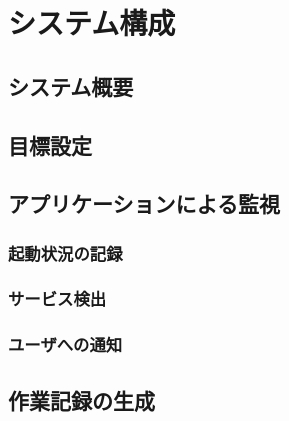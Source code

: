 \chapter{システム構成}

\section{システム概要}

\section{目標設定}

\section{アプリケーションによる監視}

\subsection{起動状況の記録}

\subsection{サービス検出}

\subsection{ユーザへの通知}

\section{作業記録の生成}


